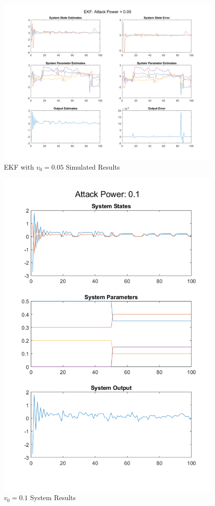 \documentclass[]{article}
\begin{document}
\begin{figure}
	\centering
	\includegraphics[width=\linewidth]{../../fig/EKF_attack_0_05}
	\caption{EKF with $v_0 = 0.05$ Simulated Results}
	\label{fig:ekfattack005}
\end{figure}

\begin{figure}
	\centering
	\includegraphics[width=0.7\linewidth]{../../fig/SystemResponse_attack_0_1}
	\caption{$v_0 = 0.1$ System Results}
	\label{fig:systemresponseattack01}
\end{figure}
\end{document}
